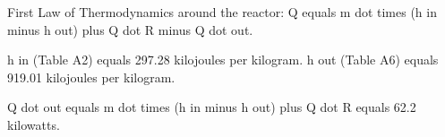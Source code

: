 First Law of Thermodynamics around the reactor:  
Q equals m dot times (h in minus h out) plus Q dot R minus Q dot out.  

h in (Table A2) equals 297.28 kilojoules per kilogram.  
h out (Table A6) equals 919.01 kilojoules per kilogram.  

Q dot out equals m dot times (h in minus h out) plus Q dot R equals 62.2 kilowatts.